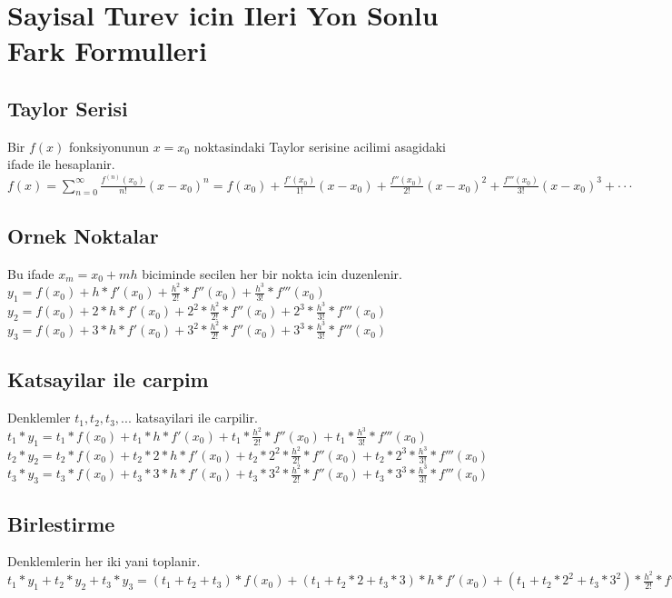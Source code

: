 \documentclass{article}
\begin{document}
\setlength\parindent{0pt}
\section{Sayisal Turev icin Ileri Yon Sonlu Fark Formulleri}
\subsection{Taylor Serisi}
Bir $f(x)$ fonksiyonunun $x=x_{0}$ noktasindaki Taylor serisine acilimi asagidaki ifade ile hesaplanir.\\
$\displaystyle f(x)=\sum_{n=0}^{\infty}\frac{f^{(n)}(x_{0})}{n!}(x-x_{0})^n = f(x_{0}) + \frac{f'(x_{0})}{1!}(x-x_{0}) + \frac{f''(x_{0})}{2!}(x-x_{0})^2 + \frac{f'''(x_{0})}{3!}(x-x_{0})^3 + \cdot\cdot\cdot$
\subsection{Ornek Noktalar}
Bu ifade $x_{m}=x_{0}+mh$ biciminde secilen her bir nokta icin duzenlenir.\\
$\displaystyle y_{1}=f(x_{0})+h*f'(x_{0})+\frac{h^{2}}{2!}*f''(x_{0})+\frac{h^{3}}{3!}*f'''(x_{0})$\\
$\displaystyle y_{2}=f(x_{0})+2*h*f'(x_{0})+2^{2}*\frac{h^{2}}{2!}*f''(x_{0})+2^{3}*\frac{h^{3}}{3!}*f'''(x_{0})$\\
$\displaystyle y_{3}=f(x_{0})+3*h*f'(x_{0})+3^{2}*\frac{h^{2}}{2!}*f''(x_{0})+3^{3}*\frac{h^{3}}{3!}*f'''(x_{0})$\\
\subsection{Katsayilar ile carpim}
Denklemler $t_{1}, t_{2}, t_{3}, ...$ katsayilari ile carpilir.\\
$\displaystyle t_{1}*y_{1}=t_{1}*f(x_{0})+t_{1}*h*f'(x_{0})+t_{1}*\frac{h^{2}}{2!}*f''(x_{0})+t_{1}*\frac{h^{3}}{3!}*f'''(x_{0})$\\
$\displaystyle t_{2}*y_{2}=t_{2}*f(x_{0})+t_{2}*2*h*f'(x_{0})+t_{2}*2^{2}*\frac{h^{2}}{2!}*f''(x_{0})+t_{2}*2^{3}*\frac{h^{3}}{3!}*f'''(x_{0})$\\
$\displaystyle t_{3}*y_{3}=t_{3}*f(x_{0})+t_{3}*3*h*f'(x_{0})+t_{3}*3^{2}*\frac{h^{2}}{2!}*f''(x_{0})+t_{3}*3^{3}*\frac{h^{3}}{3!}*f'''(x_{0})$\\
\subsection{Birlestirme}
Denklemlerin her iki yani toplanir.\\
$\displaystyle t_{1}*y_{1}+t_{2}*y_{2}+t_{3}*y_{3}=(t_{1}+t_{2}+t_{3})*f(x_{0})+(t_{1}+t_{2}*2+t_{3}*3)*h*f'(x_{0})+(t_{1}+t_{2}*2^{2}+t_{3}*3^{2})*\frac{h^{2}}{2!}*f''(x_{0})+(t_{1}+t_{2}*2^{3}+t_{3}*3^{3})*\frac{h^{3}}{3!}*f'''(x_{0})$
\end{document}
